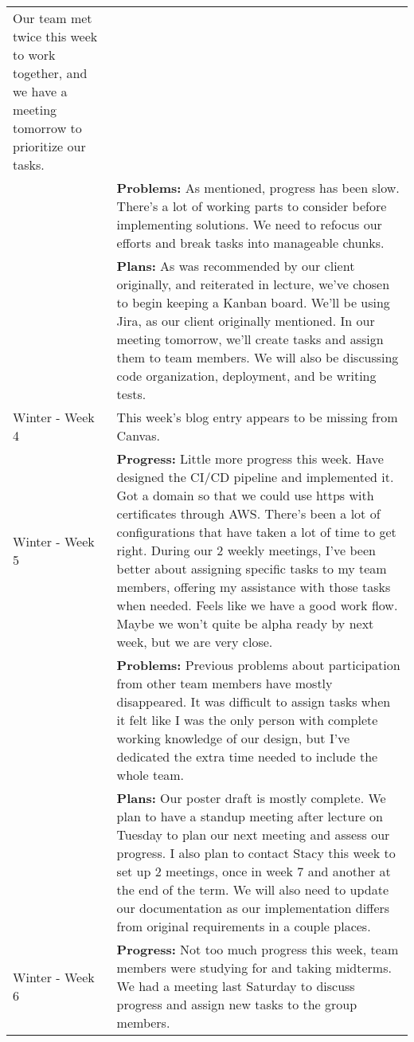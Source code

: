\begin{longtable}[ht]{| p{1.5cm} | p{13.5cm} |}
     Our team met twice this week to work together, and we have a meeting tomorrow to prioritize our tasks.
     \\ & \textbf{Problems:} As mentioned, progress has been slow.
     There's a lot of working parts to consider before implementing solutions.
     We need to refocus our efforts and break tasks into manageable chunks.
     \\ & \textbf{Plans:} As was recommended by our client originally, and reiterated in lecture, we've chosen to begin keeping a Kanban board.
     We'll be using Jira, as our client originally mentioned.
     In our meeting tomorrow, we'll create tasks and assign them to team members. 
     We will also be discussing code organization, deployment, and be writing tests.
     \\
     \hline
     Winter - Week 4 &
     This week's blog entry appears to be missing from Canvas.
     \\
     \hline
     Winter - Week 5 &
     \textbf{Progress:} Little more progress this week.
     Have designed the CI/CD pipeline and implemented it.
     Got a domain so that we could use https with certificates through AWS.
     There's been a lot of configurations that have taken a lot of time to get right.
     During our 2 weekly meetings, I've been better about assigning specific tasks to my team members, offering my assistance with those tasks when needed.
     Feels like we have a good work flow. Maybe we won't quite be alpha ready by next week, but we are very close.
     \\ & \textbf{Problems:} Previous problems about participation from other team members have mostly disappeared.
     It was difficult to assign tasks when it felt like I was the only person with complete working knowledge of our design, but I've dedicated the extra time needed to include the whole team.
     \\ & \textbf{Plans:} Our poster draft is mostly complete.
     We plan to have a standup meeting after lecture on Tuesday to plan our next meeting and assess our progress.
     I also plan to contact Stacy this week to set up 2 meetings, once in week 7 and another at the end of the term.
     We will also need to update our documentation as our implementation differs from original requirements in a couple places.
     \\
     \hline
     Winter - Week 6 &
     \textbf{Progress:} Not too much progress this week, team members were studying for and taking midterms.
     We had a meeting last Saturday to discuss progress and assign new tasks to the group members.

\end{longtable}

